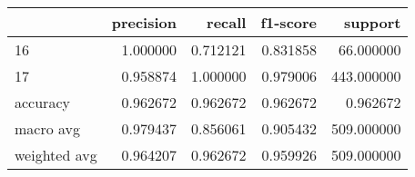 \begin{tabular}{lrrrr}
\toprule
 & precision & recall & f1-score & support \\
\midrule
16 & 1.000000 & 0.712121 & 0.831858 & 66.000000 \\
17 & 0.958874 & 1.000000 & 0.979006 & 443.000000 \\
accuracy & 0.962672 & 0.962672 & 0.962672 & 0.962672 \\
macro avg & 0.979437 & 0.856061 & 0.905432 & 509.000000 \\
weighted avg & 0.964207 & 0.962672 & 0.959926 & 509.000000 \\
\bottomrule
\end{tabular}
